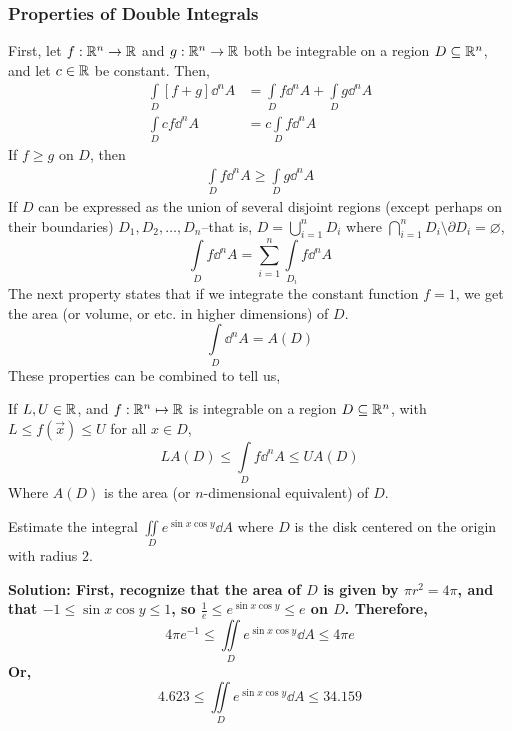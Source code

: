 \subsubsection{Properties of Double Integrals}
First, let \( f: \mathbb{R}^n\to\mathbb{R} \) and \( g: \mathbb{R}^n\to\mathbb{R} \) both be integrable on a region \( D\subseteq \mathbb{R}^n \), and let \( c\in\mathbb{R} \) be constant. Then, 
\begin{align}
    \int\limits_D [f+g]\dd^n A &= \int\limits_D f\dd^n A + \int\limits_Dg\dd^n A \\
    \int\limits_D cf\dd^n A &= c\int\limits_D f\dd^n A
\end{align}
If \( f \geq g \) on \( D \), then
\begin{align}
    \int\limits_D f\dd^n A \geq \int\limits_D g\dd^n A
\end{align}
If \( D \) can be expressed as the union of several disjoint regions (except perhaps on their boundaries) \( D_1,D_2,\dots,D_n \)--that is, \( D = \bigcup_{i=1}^{n}D_i \) where \( \bigcap_{i=1}^n D_i\setminus \partial D_i = \varnothing \),
\[ \int\limits_D f\dd^n A = \sum_{i=1}^n \int\limits_{D_i}f\dd^n A\]
The next property states that if we integrate the constant function \( f = 1 \), we get the area (or volume, or etc. in higher dimensions) of \( D \).
\[ \int\limits_D \dd^n A = A(D)\]
These properties can be combined to tell us,
\begin{theorem} \label{area}
    If \( L, U\in\mathbb{R} \), and \( f: \mathbb{R}^n\mapsto \mathbb{R} \) is integrable on a region \( D\subseteq \mathbb{R}^n \), with \( L \leq f(\vec x) \leq U \) for all \( x\in D \),
    \[ LA(D) \leq \int\limits_Df\dd^nA \leq UA(D)\] 
    Where \( A(D) \) is the area (or \( n \)-dimensional equivalent) of \( D \).
\end{theorem}
\begin{example}
    Estimate the integral \( \iint\limits_D e^{\sin x\cos y}\dd A \) where \( D \) is the disk centered on the origin with radius \( 2 \). \par\bf{Solution: }First, recognize that the area of \( D \) is given by \( \pi r^2 = 4\pi \), and that \( -1 \leq \sin x\cos y \leq 1 \), so \( \frac{1}{e} \leq e^{\sin x\cos y} \leq e \) on \( D \). Therefore, 
    \[ 4\pi e^{-1} \leq \iint\limits_D e^{\sin x\cos y}\dd A \leq 4\pi e\] 
    Or,
    \[ 4.623 \leq \iint\limits_D e^{\sin x\cos y}\dd A \leq 34.159\]
\end{example}
